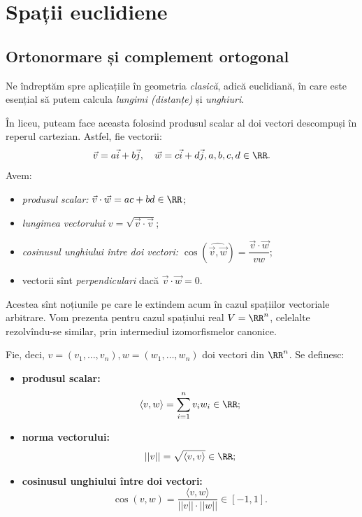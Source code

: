 
\chapter{Spații euclidiene}

\section{Ortonormare și complement ortogonal}

Ne îndreptăm spre aplicațiile în geometria \emph{clasică}, adică
euclidiană, în care este esențial să putem calcula \emph{lungimi (distanțe)}
și \emph{unghiuri}.

În liceu, puteam face aceasta folosind produsul scalar al doi vectori
descompuși în reperul cartezian. Astfel, fie vectorii:
\[
  \vec{v} = a \vec{i} + b \vec{j}, \quad \vec{w} = c \vec{i} + d \vec{j}, %
  a, b, c, d \in \RR.
\]
Avem:
\begin{itemize}
\item \emph{produsul scalar:} $ \vec{v} \cdot \vec{w} = ac + bd \in \RR $;
\item \emph{lungimea vectorului} $ v = \sqrt{\vec{v} \cdot \vec{v}} $;
\item \emph{cosinusul unghiului între doi vectori:} %
  $ \cos(\widehat{\vec{v}, \vec{w}}) = \dfrac{\vec{v} \cdot \vec{w}}{v w} $;
\item vectorii sînt \emph{perpendiculari} dacă $ \vec{v} \cdot \vec{w} = 0 $.
\end{itemize}

Acestea sînt noțiunile pe care le extindem acum în cazul spațiilor vectoriale
arbitrare. Vom prezenta pentru cazul spațiului real $ V = \RR^n $, celelalte
rezolvîndu-se similar, prin intermediul izomorfismelor canonice.

Fie, deci, $ v = (v_1, \dots, v_n), w = (w_1, \dots, w_n) $ doi vectori
din $ \RR^n $. Se definesc:
\begin{itemize}  
\item \textbf{produsul scalar:}
  \[
    \langle v, w \rangle = \sum_{i = 1}^n v_i w_i \in \RR;
  \]
\item \textbf{norma vectorului:}
  \[
    || v || = \sqrt{\langle v, v \rangle} \in \RR;
  \]
\item \textbf{cosinusul unghiului între doi vectori:}
  \[
      \cos(v, w) = \frac{\langle v, w \rangle}{||v|| \cdot ||w||} \in [-1, 1].
  \]
\end{itemize}

